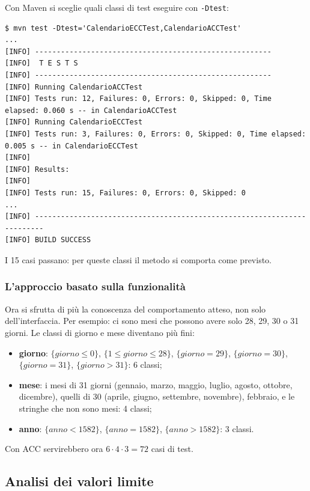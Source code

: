 Con Maven si sceglie quali classi di test eseguire con \texttt{-Dtest}:

\begin{lstlisting}[style=shell, name=Terminale]
$ mvn test -Dtest='CalendarioECCTest,CalendarioACCTest'
...
[INFO] -------------------------------------------------------
[INFO]  T E S T S
[INFO] -------------------------------------------------------
[INFO] Running CalendarioACCTest
[INFO] Tests run: 12, Failures: 0, Errors: 0, Skipped: 0, Time elapsed: 0.060 s -- in CalendarioACCTest
[INFO] Running CalendarioECCTest
[INFO] Tests run: 3, Failures: 0, Errors: 0, Skipped: 0, Time elapsed: 0.005 s -- in CalendarioECCTest
[INFO]
[INFO] Results:
[INFO]
[INFO] Tests run: 15, Failures: 0, Errors: 0, Skipped: 0
...
[INFO] ------------------------------------------------------------------------
[INFO] BUILD SUCCESS
\end{lstlisting}

I 15 casi passano: per queste classi il metodo si comporta come previsto.

\subsubsection*{L'approccio basato sulla funzionalità}

Ora si sfrutta di più la conoscenza del comportamento atteso, non solo dell'interfaccia. Per esempio: ci sono mesi che
possono avere solo 28, 29, 30 o 31 giorni. Le classi di giorno e mese diventano più fini:

\begin{itemize}
  \item \textbf{giorno}: \(\{giorno \le 0\}\), \(\{1 \le giorno \le 28\}\), \(\{giorno = 29\}\), \(\{giorno = 30\}\),
        \(\{giorno = 31\}\), \(\{giorno > 31\}\): 6 classi;
  \item \textbf{mese}: i mesi di 31 giorni (gennaio, marzo, maggio, luglio, agosto, ottobre, dicembre), quelli di 30
        (aprile, giugno, settembre, novembre), febbraio, e le stringhe che non sono mesi: 4 classi;
  \item \textbf{anno}: \(\{anno < 1582\}\), \(\{anno = 1582\}\), \(\{anno > 1582\}\): 3 classi.
\end{itemize}

Con ACC servirebbero ora \(6 \cdot 4 \cdot 3 = 72\) casi di test.

\subsection{Analisi dei valori limite}

